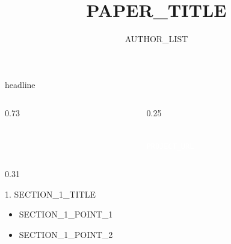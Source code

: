 \documentclass[final]{beamer}
\title{{{PAPER_TITLE}}}
\author{{{AUTHOR_LIST}}}
\institute{\textbf{{{CONFERENCE_NAME}} Oral Presentation} \quad $\cdot$ \quad \url{{{PROJECT_URL}}}}
\begin{document}
\begin{frame}{} 

\begin{beamercolorbox}[wd=\paperwidth,leftskip=1cm,rightskip=1cm]{headline}
  \begin{columns}[T]
    \begin{column}{0.73\linewidth}
      \raggedright
    \end{column}
    \begin{column}{0.25\linewidth}
      \vspace{-1.5ex}
      \begin{tcolorbox}[colback=black!50!green,colframe=white,arc=6pt,left=8pt,right=8pt,top=12pt,bottom=12pt]
        \centering
        \textcolor{white}{}\\[0.6em]
        \textcolor{white}{\large\texttt{{{PROJECT_URL}}}}
      \end{tcolorbox}
    \end{column}
  \end{columns}
\end{beamercolorbox}
\vspace{0.3cm}

\begin{columns}[t]

\begin{column}{0.31\textwidth}

\begin{block}{1. {{SECTION_1_TITLE}}}
\small
\begin{itemize}
    \setlength{\itemsep}{0pt}
    \item {{SECTION_1_POINT_1}}
    \item {{SECTION_1_POINT_2}}
\end{itemize}


\end{block}
\end{column}
\end{columns}
\end{frame}
\end{document}
